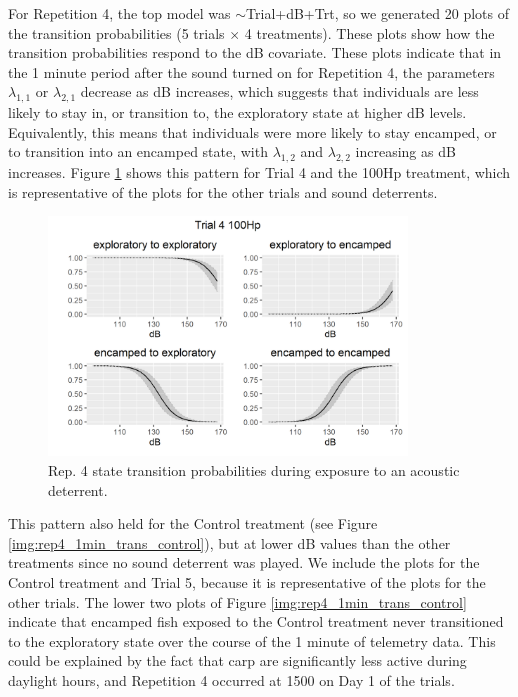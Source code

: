 \documentclass[12pt]{article}
\begin{document}
	For Repetition 4, the top model was $\sim$Trial+dB+Trt, so we generated 20 plots of the transition probabilities (5 trials $\times$ 4 treatments). These plots show how the transition probabilities respond to the dB covariate. These plots indicate that in the 1 minute period after the sound turned on for Repetition 4, the parameters $\lambda_{1, 1}$ or $\lambda_{2, 1}$ decrease as dB increases, which suggests that individuals are less likely to stay in, or transition to, the exploratory state at higher dB levels. Equivalently, this means that individuals were more likely to stay encamped, or to transition into an encamped state, with $\lambda_{1, 2}$ and $\lambda_{2, 2}$ increasing as dB increases. Figure \ref{img:rep4_1min_trans_tmnt} shows this pattern for Trial 4 and the 100Hp treatment, which is representative of the plots for the other trials and sound deterrents.
	
	\begin{figure}
		\centering
		\includegraphics[width=0.85\textwidth]{trans_rep_4_trial_4_100Hp.png}
		\caption{Rep. 4 state transition probabilities during exposure to an acoustic deterrent.}
		\label{img:rep4_1min_trans_tmnt}
	\end{figure}
	
	This pattern also held for the Control treatment (see Figure \ref{img:rep4_1min_trans_control}), but at lower dB values than the other treatments since no sound deterrent was played. We include the plots for the Control treatment and Trial 5, because it is representative of the plots for the other trials. The lower two plots of Figure \ref{img:rep4_1min_trans_control} indicate that encamped fish exposed to the Control treatment never transitioned to the exploratory state over the course of the 1 minute of telemetry data. This could be explained by the fact that carp are significantly less active during daylight hours, and Repetition 4 occurred at 1500 on Day 1 of the trials.
	
\end{document}
